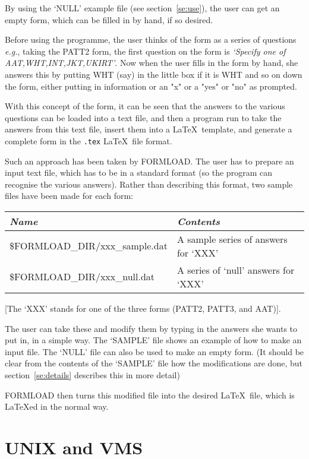 By using the `NULL' example file (see section~\ref{se:use}), the user can
get an empty form, which can be filled in by hand, if so desired. 

Before using the programme, the user thinks of the form as a series of
questions {\em e.g.}, taking the PATT2 form, the first question on the form
is {\it `Specify one of AAT,WHT,INT,JKT,UKIRT'\/}.  Now when the user
fills in the form by hand, she answers this by putting WHT (say) in the
little box if it is WHT and so on down the form, either putting in
information or an "x" or a "yes" or "no" as prompted.

With this concept of the form, it can be seen that the answers to the
various questions can be loaded into a text file, and then a program run to
take the answers from this text file, insert them into a \LaTeX\ template,
and generate a complete form in the {\tt .tex} \LaTeX\ file
format. 

Such an approach has been taken by FORMLOAD. The user has to prepare an
input text file, which has to be in a standard format (so the program can
recognise the various answers). Rather than describing this format, two
sample files have been made for each form:

\begin{center}
\begin{tabular}{|l|l|}\hline
{\it Name}        & {\it Contents}    \\ \hline \hline
\$FORMLOAD\_DIR/xxx\_sample.dat & A sample series of answers for `XXX' \\ \hline
\$FORMLOAD\_DIR/xxx\_null.dat   & A series of `null' answers for `XXX' \\ \hline
\end{tabular}
\end{center}

[The `XXX' stands for one of the three forms (PATT2, PATT3, and AAT)].

The user can take these and modify them by typing in the answers she wants
to put in, in a simple way. The `SAMPLE' file shows an example of how to
make an input file. The `NULL' file can also be used to make an empty form.
(It should be clear from the contents of the `SAMPLE' file how the
modifications are done, but section~\ref{se:details} describes this in more
detail) 

FORMLOAD then turns this modified file into the desired \LaTeX\ file, 
which is \LaTeX ed in the normal way. 

\section{UNIX and VMS}

